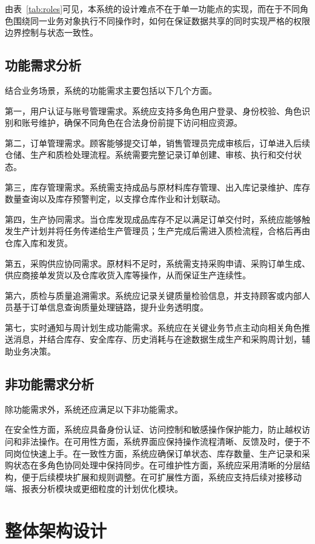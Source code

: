 由表~\ref{tab:roles}可见，本系统的设计难点不在于单一功能点的实现，而在于不同角色围绕同一业务对象执行不同操作时，如何在保证数据共享的同时实现严格的权限边界控制与状态一致性。

\subsection{功能需求分析}

结合业务场景，系统的功能需求主要包括以下几个方面。

第一，用户认证与账号管理需求。系统应支持多角色用户登录、身份校验、角色识别和账号维护，确保不同角色在合法身份前提下访问相应资源。

第二，订单管理需求。顾客能够提交订单，销售管理员完成审核后，订单进入后续仓储、生产和质检处理流程。系统需要完整记录订单创建、审核、执行和交付状态。

第三，库存管理需求。系统需支持成品与原材料库存管理、出入库记录维护、库存数量查询以及库存预警判定，以支撑仓库作业和计划联动。

第四，生产协同需求。当仓库发现成品库存不足以满足订单交付时，系统应能够触发生产计划并将任务传递给生产管理员；生产完成后需进入质检流程，合格后再由仓库入库和发货。

第五，采购供应协同需求。原材料不足时，系统需支持采购申请、采购订单生成、供应商接单发货以及仓库收货入库等操作，从而保证生产连续性。

第六，质检与质量追溯需求。系统应记录关键质量检验信息，并支持顾客或内部人员基于订单信息查询质量处理链路，提升业务透明度。

第七，实时通知与周计划生成功能需求。系统应在关键业务节点主动向相关角色推送消息，并结合库存、安全库存、历史消耗与在途数据生成生产和采购周计划，辅助业务决策。

\subsection{非功能需求分析}

除功能需求外，系统还应满足以下非功能需求。

在安全性方面，系统应具备身份认证、访问控制和敏感操作保护能力，防止越权访问和非法操作。在可用性方面，系统界面应保持操作流程清晰、反馈及时，便于不同岗位快速上手。在一致性方面，系统应确保订单状态、库存数量、生产记录和采购状态在多角色协同处理中保持同步。在可维护性方面，系统应采用清晰的分层结构，便于后续模块扩展和规则调整。在可扩展性方面，系统应支持后续对接移动端、报表分析模块或更细粒度的计划优化模块。

\section{整体架构设计}

